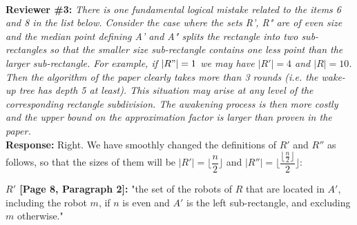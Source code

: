 \documentclass[review]{elsarticle}
\begin{document}
\\
\textbf{Reviewer \#3:} \textit{There is one fundamental logical mistake related to the items 6 and 8 in the list below. Consider the case where the sets R', R" are of even size and the median point defining A' and A" splits the rectangle into two sub-rectangles so that the smaller size sub-rectangle contains one less point than the larger sub-rectangle. For example, if $|R"|=1$ we may have $|R'|=4$ and $|R|=10$. Then the algorithm of the paper clearly takes more than 3 rounds (i.e. the wake-up tree has depth 5 at least). This situation may arise at any level of the corresponding rectangle subdivision. The awakening process is then more costly and the upper bound on the approximation factor is larger than proven in the paper.}
\\
\textbf{Response:} Right. We have smoothly changed the definitions of $R'$ and $R''$ as follows, so that the sizes of them will be ${ |R'|=\lfloor\dfrac{n}{2}\rfloor }$ and ${ |R''|=\big\lfloor\dfrac{\lfloor\frac{n}{2}\rfloor}{2}\big\rfloor}$:

\textbf{$R'$ [Page 8, Paragraph 2]:} "the set of the robots of $R$ that are located in $A'$, including the robot $m$, if $n$ is even and $A'$ is the left sub-rectangle, and excluding $m$ otherwise."
\end{document}
